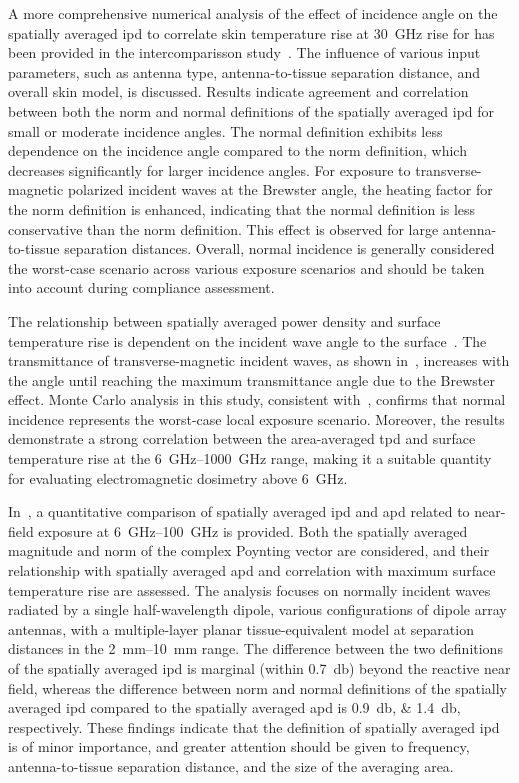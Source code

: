 A more comprehensive numerical analysis of the effect of incidence angle on the spatially averaged \gls{ipd} to correlate skin temperature rise at \SI{30}{\GHz} rise for has been provided in the intercomparisson study~\cite{Diao2021Effect}.
The influence of various input parameters, such as antenna type, antenna-to-tissue separation distance, and overall skin model, is discussed.
Results indicate agreement and correlation between both the norm and normal definitions of the spatially averaged \gls{ipd} for small or moderate incidence angles.
The normal definition exhibits less dependence on the incidence angle compared to the norm definition, which decreases significantly for larger incidence angles.
For exposure to transverse-magnetic polarized incident waves at the Brewster angle, the heating factor for the norm definition is enhanced, indicating that the normal definition is less conservative than the norm definition.
This effect is observed for large antenna-to-tissue separation distances.
Overall, normal incidence is generally considered the worst-case scenario across various exposure scenarios and should be taken into account during compliance assessment.

The relationship between spatially averaged power density and surface temperature rise is dependent on the incident wave angle to the surface~\cite{Hirata2021Assessment}.
The transmittance of transverse-magnetic incident waves, as shown in~\cite{Li2019Relationship}, increases with the angle until reaching the maximum transmittance angle due to the Brewster effect.
Monte Carlo analysis in this study, consistent with~\cite{Diao2021Effect}, confirms that normal incidence represents the worst-case local exposure scenario.
Moreover, the results demonstrate a strong correlation between the area-averaged \gls{tpd} and surface temperature rise at the \SIrange{6}{1000}{\GHz} range, making it a suitable quantity for evaluating electromagnetic dosimetry above \SI{6}{\GHz}.

In~\cite{Li2021Quantitative}, a quantitative comparison of spatially averaged \gls{ipd} and \gls{apd} related to near-field exposure at \SIrange{6}{100}{\GHz} is provided.
Both the spatially averaged magnitude and norm of the complex Poynting vector are considered, and their relationship with spatially averaged \gls{apd} and correlation with maximum surface temperature rise are assessed.
The analysis focuses on normally incident waves radiated by a single half-wavelength dipole, various configurations of dipole array antennas, with a multiple-layer planar tissue-equivalent model at separation distances in the \SIrange{2}{10}{\mm} range.
The difference between the two definitions of the spatially averaged \gls{ipd} is marginal (within \SI{0.7}{\decibel}) beyond the reactive near field, whereas the difference between norm and normal definitions of the spatially averaged \gls{ipd} compared to the spatially averaged \gls{apd} is \SIlist{0.9;1.4}{\decibel}, respectively.
These findings indicate that the definition of spatially averaged \gls{ipd} is of minor importance, and greater attention should be given to frequency, antenna-to-tissue separation distance, and the size of the averaging area.

